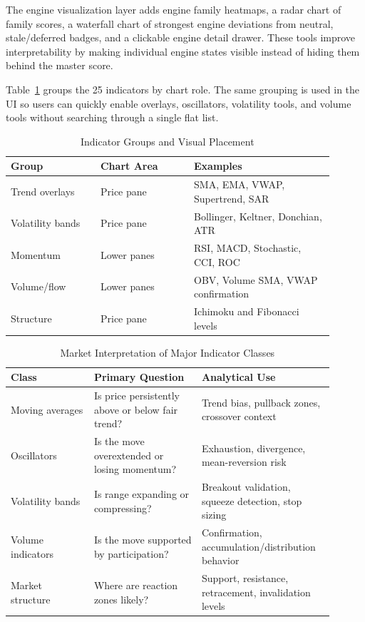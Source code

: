\documentclass[conference]{IEEEtran}
\begin{document}
The engine visualization layer adds engine family heatmaps, a radar chart of
family scores, a waterfall chart of strongest engine deviations from neutral,
stale/deferred badges, and a clickable engine detail drawer. These tools
improve interpretability by making individual engine states visible instead
of hiding them behind the master score.

Table~\ref{tab:indicator-groups} groups the 25 indicators by chart role. The
same grouping is used in the UI so users can quickly enable overlays,
oscillators, volatility tools, and volume tools without searching through a
single flat list.

\begin{table}[!t]
\caption{Indicator Groups and Visual Placement}
\label{tab:indicator-groups}
\centering
\begin{tabular}{@{}p{0.25\linewidth}p{0.26\linewidth}p{0.39\linewidth}@{}}
\toprule
\textbf{Group} & \textbf{Chart Area} & \textbf{Examples} \\
\midrule
Trend overlays & Price pane & SMA, EMA, VWAP, Supertrend, SAR \\
Volatility bands & Price pane & Bollinger, Keltner, Donchian, ATR \\
Momentum & Lower panes & RSI, MACD, Stochastic, CCI, ROC \\
Volume/flow & Lower panes & OBV, Volume SMA, VWAP confirmation \\
Structure & Price pane & Ichimoku and Fibonacci levels \\
\bottomrule
\end{tabular}
\end{table}

\begin{table}[!t]
\caption{Market Interpretation of Major Indicator Classes}
\label{tab:indicator-interpretation}
\centering
\begin{tabular}{@{}p{0.24\linewidth}p{0.31\linewidth}p{0.35\linewidth}@{}}
\toprule
\textbf{Class} & \textbf{Primary Question} & \textbf{Analytical Use} \\
\midrule
Moving averages & Is price persistently above or below fair trend? &
Trend bias, pullback zones, crossover context \\
Oscillators & Is the move overextended or losing momentum? &
Exhaustion, divergence, mean-reversion risk \\
Volatility bands & Is range expanding or compressing? &
Breakout validation, squeeze detection, stop sizing \\
Volume indicators & Is the move supported by participation? &
Confirmation, accumulation/distribution behavior \\
Market structure & Where are reaction zones likely? &
Support, resistance, retracement, invalidation levels \\
\bottomrule
\end{tabular}
\end{table}
\end{document}

